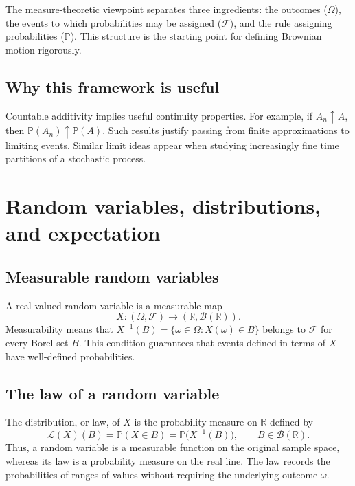 \documentclass[11pt,a4paper,oneside]{article}
\newcommand{\Prob}{\mathbb{P}}
\newcommand{\R}{\mathbb{R}}
\newcommand{\Borel}{\mathcal{B}}
\newcommand{\F}{\mathcal{F}}
\newcommand{\Om}{\Omega}
\newcommand{\Law}{\mathcal{L}}
\begin{document}
\begin{keyidea}
The measure-theoretic viewpoint separates three ingredients: the outcomes ($\Om$), the events to which probabilities may be assigned ($\F$), and the rule assigning probabilities ($\Prob$). This structure is the starting point for defining Brownian motion rigorously.
\end{keyidea}

\subsection{Why this framework is useful}
Countable additivity implies useful continuity properties. For example, if $A_n\uparrow A$, then $\Prob(A_n)\uparrow\Prob(A)$. Such results justify passing from finite approximations to limiting events. Similar limit ideas appear when studying increasingly fine time partitions of a stochastic process.

\section{Random variables, distributions, and expectation}
\subsection{Measurable random variables}
A real-valued random variable is a measurable map
\[
 X:(\Om,\F)\longrightarrow(\R,\Borel(\R)).
\]
Measurability means that $X^{-1}(B)=\{\omega\in\Om:X(\omega)\in B\}$ belongs to $\F$ for every Borel set $B$. This condition guarantees that events defined in terms of $X$ have well-defined probabilities.

\subsection{The law of a random variable}
The distribution, or law, of $X$ is the probability measure on $\R$ defined by
\begin{equation}\label{eq:law}
 \Law(X)(B)=\Prob(X\in B)=\Prob\bigl(X^{-1}(B)\bigr),
 \qquad B\in\Borel(\R).
\end{equation}
Thus, a random variable is a measurable function on the original sample space, whereas its law is a probability measure on the real line. The law records the probabilities of ranges of values without requiring the underlying outcome $\omega$.
\end{document}
